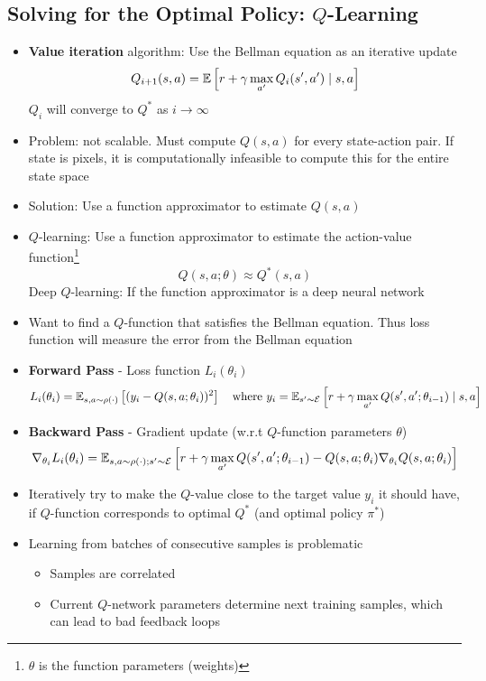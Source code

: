 \subsection{Solving for the Optimal Policy: $Q$-Learning}
\begin{itemize}
	\item \textbf{Value iteration} algorithm: Use the Bellman equation as an iterative update
	$$Q_{i+1} (s, a) = \mathbb{E}\left[r + \gamma \max_{a'} Q_i (s', a') \mid s, a\right]$$
	$Q_i$ will converge to $Q^\ast$ as $i \rightarrow \infty$
	\item Problem: not scalable. Must compute $Q(s, a)$ for every state-action pair. If state is pixels, it is computationally infeasible to compute this for the entire state space
	\item Solution: Use a function approximator to estimate $Q(s, a)$
	\item $Q$-learning: Use a function approximator to estimate the action-value function\footnote{$\theta$ is the function parameters (weights)}
	$$Q(s, a; \theta) \approx Q^\ast (s, a)$$
	Deep $Q$-learning: If the function approximator is a deep neural network
	\item Want to find a $Q$-function that satisfies the Bellman equation. Thus loss function will measure the error from the Bellman equation
	\item \textbf{Forward Pass} - Loss function $L_i(\theta_i)$
	$$L_i(\theta_i) = \mathbb{E}_{s, a\sim \rho(\cdot)}\left[(y_i - Q(s, a;\theta_i))^2\right] \quad \text{where } y_i = \mathbb{E}_{s'\sim \mathcal{E}}\left[r + \gamma \max_{a'} Q(s', a';\theta_{i-1}) \mid s, a\right]$$
	\item \textbf{Backward Pass} - Gradient update (w.r.t $Q$-function parameters $\theta$)
	$$\nabla_{\theta_i} L_i(\theta_i) = \mathbb{E}_{s, a\sim \rho(\cdot);s'\sim \mathcal{E}}\left[r + \gamma \max_{a'} Q(s', a';\theta_{i-1}) - Q(s, a;\theta_i)\nabla_{\theta_i}Q(s, a;\theta_i)\right]$$
	\item Iteratively try to make the $Q$-value close to the target value $y_i$ it should have, if $Q$-function corresponds to optimal $Q^\ast$ (and optimal policy $\pi^\ast$)
	\item Learning from batches of consecutive samples is problematic
	\begin{itemize}
		\item Samples are correlated
		\item Current $Q$-network parameters determine next training samples, which can lead to bad feedback loops
	\end{itemize}

\end{itemize}
